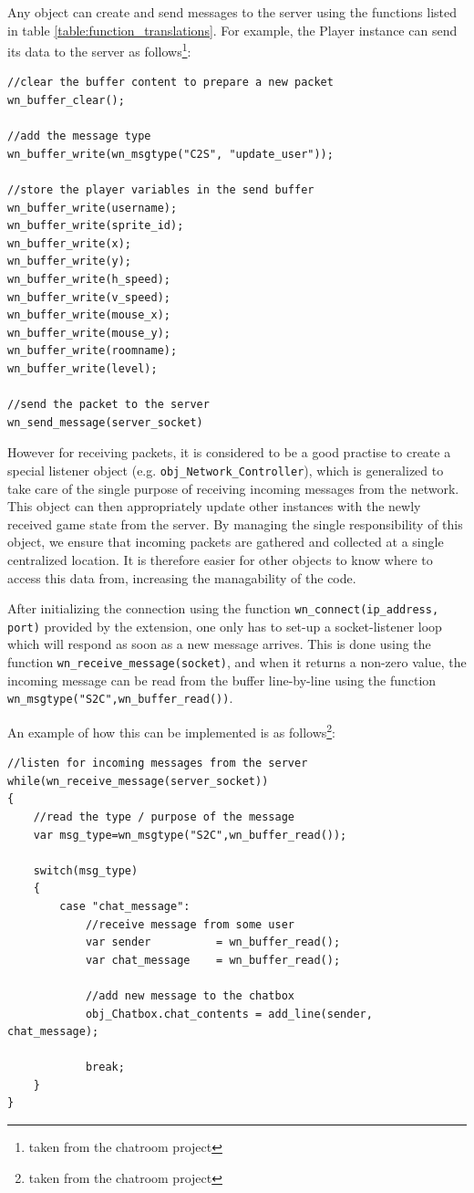 \documentclass[bsc, 12pt, twoside, singlespacing, parskip, abbrevs, notimes, normalheadings, logo]{styles/infthesis}
\begin{document}
Any object can create and send messages to the server using the functions listed in table \ref{table:function_translations}. For example, the Player instance can send its data to the server as follows\footnote{taken from the chatroom project}:
\begin{verbatim}
//clear the buffer content to prepare a new packet
wn_buffer_clear();

//add the message type
wn_buffer_write(wn_msgtype("C2S", "update_user"));

//store the player variables in the send buffer
wn_buffer_write(username);
wn_buffer_write(sprite_id);
wn_buffer_write(x);
wn_buffer_write(y);
wn_buffer_write(h_speed);
wn_buffer_write(v_speed);
wn_buffer_write(mouse_x);
wn_buffer_write(mouse_y);
wn_buffer_write(roomname);
wn_buffer_write(level);

//send the packet to the server
wn_send_message(server_socket)     
\end{verbatim}

However for receiving packets, it is considered to be a good practise to create a special listener object (e.g. \texttt{obj\_Network\_Controller}), which is generalized to take care of the single purpose of receiving incoming messages from the network. This object can then appropriately update other instances with the newly received game state from the server. By managing the single responsibility of this object, we ensure that incoming packets are gathered and collected at a single centralized location. It is therefore easier for other objects to know where to access this data from, increasing the managability of the code.

After initializing the connection using the function \texttt{wn\_connect(ip\_address, port)} provided by the extension, one only has to set-up a socket-listener loop which will respond as soon as a new message arrives. This is done using the function \texttt{wn\_receive\_message(socket)}, and when it returns a non-zero value, the incoming message can be read from the buffer line-by-line using the function \texttt{wn\_msgtype("S2C",wn\_buffer\_read())}.

An example of how this can be implemented is as follows\footnote{taken from the chatroom project}:
\begin{verbatim}
//listen for incoming messages from the server
while(wn_receive_message(server_socket))
{
	//read the type / purpose of the message
	var msg_type=wn_msgtype("S2C",wn_buffer_read());
	
	switch(msg_type)
	{
		case "chat_message":
			//receive message from some user
			var sender          = wn_buffer_read();
			var chat_message    = wn_buffer_read();
			
			//add new message to the chatbox
			obj_Chatbox.chat_contents = add_line(sender, chat_message);
			
			break;
	}
}
\end{verbatim}
\end{document}
